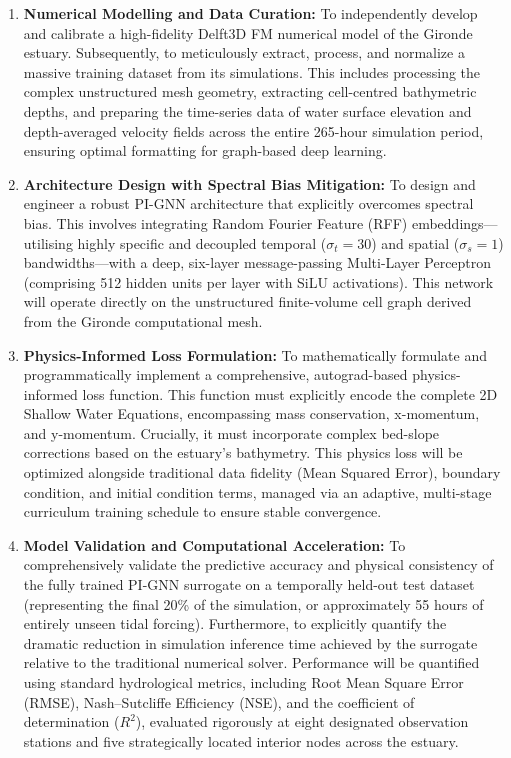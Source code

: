 \begin{enumerate}
    \item \textbf{Numerical Modelling and Data Curation:} To independently develop and calibrate a high-fidelity Delft3D FM numerical model of the Gironde
    estuary. Subsequently, to meticulously extract, process, and normalize a massive training
    dataset from its simulations. This includes processing the complex unstructured mesh geometry, extracting cell-centred
    bathymetric depths, and preparing the time-series data of water surface elevation and depth-averaged
    velocity fields across the entire 265-hour simulation period, ensuring optimal formatting for graph-based deep learning.

    \item \textbf{Architecture Design with Spectral Bias Mitigation:} To design and engineer a robust PI-GNN architecture that explicitly overcomes spectral bias. This involves integrating Random Fourier
    Feature (RFF) embeddings---utilising highly specific and decoupled temporal ($\sigma_t = 30$)
    and spatial ($\sigma_s = 1$) bandwidths---with a deep, six-layer
    message-passing Multi-Layer Perceptron (comprising 512 hidden units per layer with SiLU activations). This network will operate directly on the
    unstructured finite-volume cell graph derived from the Gironde computational mesh.

    \item \textbf{Physics-Informed Loss Formulation:} To mathematically formulate and programmatically implement a comprehensive, autograd-based physics-informed
    loss function. This function must explicitly encode the complete 2D Shallow Water Equations, encompassing mass
    conservation, x-momentum, and y-momentum. Crucially, it must incorporate complex bed-slope corrections based on the estuary's bathymetry. This physics loss will be optimized alongside traditional data fidelity (Mean Squared Error), boundary condition, and initial condition
    terms, managed via an adaptive, multi-stage
    curriculum training schedule to ensure stable convergence.

    \item \textbf{Model Validation and Computational Acceleration:} To comprehensively validate the predictive accuracy and physical consistency of the fully trained PI-GNN surrogate on a temporally
    held-out test dataset (representing the final 20\% of the simulation, or approximately 55
    hours of entirely unseen tidal forcing). Furthermore, to explicitly quantify the dramatic reduction in simulation inference time achieved by the surrogate relative to the traditional numerical solver. Performance will be quantified using standard hydrological metrics, including Root Mean Square Error (RMSE),
    Nash--Sutcliffe Efficiency (NSE), and the coefficient of
    determination ($R^2$), evaluated rigorously at eight designated observation stations and
    five strategically located interior nodes across the estuary.


\end{enumerate}
